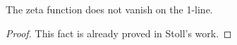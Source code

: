 \begin{theorem}
\label{ZetaNoZerosOn1Line}
\leanok
The zeta function does not vanish on the 1-line.
\end{theorem}
\begin{proof}
\leanok
This fact is already proved in Stoll's work.
\end{proof}
